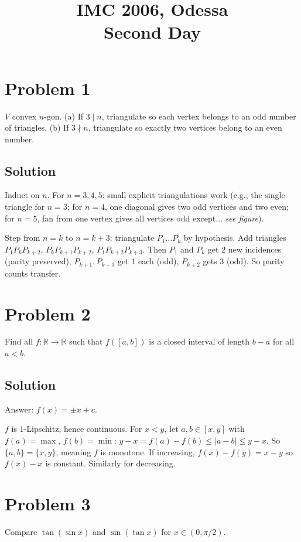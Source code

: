 \documentclass{article}
\title{IMC 2006, Odessa \\ Second Day}
\date{}
\begin{document}
\maketitle

\section*{Problem 1}
$V$ convex $n$-gon. (a) If $3 \mid n$, triangulate so each vertex belongs to an odd number of triangles. (b) If $3 \nmid n$, triangulate so exactly two vertices belong to an even number.

\subsection*{Solution}
Induct on $n$. For $n = 3, 4, 5$: small explicit triangulations work (e.g., the single triangle for $n = 3$; for $n = 4$, one diagonal gives two odd vertices and two even; for $n = 5$, fan from one vertex gives all vertices odd except... \emph{see figure}).

Step from $n = k$ to $n = k + 3$: triangulate $P_1 \ldots P_k$ by hypothesis. Add triangles $P_1 P_k P_{k+2}$, $P_k P_{k+1} P_{k+2}$, $P_1 P_{k+2} P_{k+3}$. Then $P_1$ and $P_k$ get $2$ new incidences (parity preserved), $P_{k+1}, P_{k+3}$ get $1$ each (odd), $P_{k+2}$ gets $3$ (odd). So parity counts transfer.

\section*{Problem 2}
Find all $f : \mathbb{R} \to \mathbb{R}$ such that $f([a, b])$ is a closed interval of length $b - a$ for all $a < b$.

\subsection*{Solution}
Answer: $f(x) = \pm x + c$.

$f$ is $1$-Lipschitz, hence continuous. For $x < y$, let $a, b \in [x, y]$ with $f(a) = \max$, $f(b) = \min$: $y - x = f(a) - f(b) \le |a - b| \le y - x$. So $\{a, b\} = \{x, y\}$, meaning $f$ is monotone. If increasing, $f(x) - f(y) = x - y$ so $f(x) - x$ is constant. Similarly for decreasing.

\section*{Problem 3}
Compare $\tan(\sin x)$ and $\sin(\tan x)$ for $x \in (0, \pi/2)$.
\end{document}
